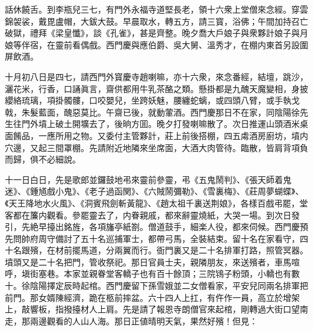 話休饒舌。到李瓶兒三七，有門外永福寺道堅長老，領十六衆上堂僧來念經。穿雲錦袈裟，戴毘盧帽，大鈸大鼓。早晨取水，轉五方，請三寳，浴佛；午間加持召亡破獄，禮拜《梁皇懺》，談《孔雀》，甚是齊整。晚夕喬大戶娘子與衆夥計娘子與月娘等伴宿，在靈前看偶戲。西門慶與應伯爵、吳大舅、溫秀才，在棚内東首另設圍屏飲酒。

十月初八日是四七，請西門外寳慶寺趙喇嘛，亦十六衆，來念番經，結壇，跳沙，灑花米，行香，口誦眞言，齋供都用牛乳茶酪之類。懸掛都是九醜天魔變相，身披纓絡琉璃，項掛髑髏，口咬嬰兒，坐跨妖魅，腰纏蛇螭，或四頭八臂，或手執戈戟，朱髮藍面，醜惡莫比。午齋已後，就動葷酒。西門慶那日不在家，同陰陽徐先生往門外墳上破土開壙去了，後晌方囬。晚夕打發喇嘛散了。次日推運山頭酒米桌面餚品，一應所用之物。又委付主管夥計，莊上前後搭棚，四五䖏酒房廚坊，墳内穴邊，又起三間罩棚。先請附近地隣來坐席面，大酒大肉管待。臨散，皆肩背項負而歸，俱不必細說。

十一日白日，先是歌郎並鑼鼓地弔來靈前參靈，弔《五鬼鬧判》、《張天師着鬼迷》、《鍾馗戲小鬼》、《老子過函関》、《六賊鬧彌勒》、《雪裏梅》、《莊周夢蝴蝶》、《天王降地水火風》、《洞賓飛劍斬黃龍》、《趙太祖千裏送荆娘》，各樣百戲弔罷，堂客都在簾内觀看。參罷靈去了，内眷親戚，都來辭靈燒紙，大哭一場。到次日發引，先絶早擡出銘旌，各項旛亭紙劄。僧道鼓手，細楽人役，都來伺候。西門慶預先問帥府周守備討了五十名巡捕軍士，都帶弓馬，全裝結束。留十名在家看守，四十名跟殯，在材前擺馬道，分兩翼而行。衙門裏又是二十名排軍打路，照管冥器。墳頭又是二十名把門，管收祭祀。那日官員士夫，親隣朋友，來送殯者，車馬喧呼，塡街塞巷。本家並親眷堂客轎子也有百十餘頂；三院鴇子粉頭，小轎也有數十。徐陰陽擇定辰時起棺。西門慶留下孫雪娥並二女僧看家，平安兒同兩名排軍把前門。那女婿陳經濟，跪在柩前摔盆。六十四人上扛，有仵作一員，高立於增架上，敲響板，指撥擡材人上肩。先是請了報恩寺朗僧官來起棺，剛轉過大街口望南走，那兩邊觀看的人山人海。那日正値晴明天氣，果然好殯！但見：

